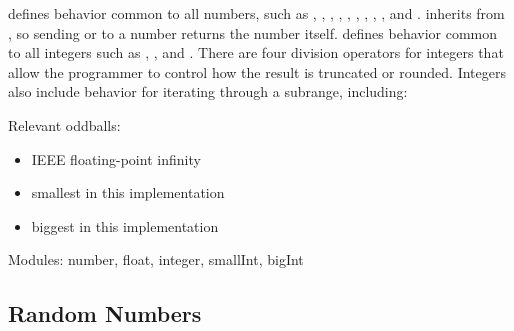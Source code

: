 \documentclass[letterpaper,10pt,english]{sphinxmanual}
\begin{document}
\begin{sphinxVerbatim}[commandchars=\\\{\}]
\end{sphinxVerbatim}

 defines behavior common to all numbers, such as , , ,
, , , , , , and . 
inherits from , so sending  or  to a number returns the
number itself.  defines behavior common to all integers such as , , and
. There are four division operators for integers that allow the programmer to control
how the result is truncated or rounded. Integers also include behavior for iterating through a subrange,
including:

\begin{sphinxVerbatim}[commandchars=\\\{\}]
\end{sphinxVerbatim}

Relevant oddballs:
\begin{itemize}
\item {} 
 IEEE floating-point infinity

\item {} 
 smallest  in this implementation

\item {} 
 biggest  in this implementation

\end{itemize}

Modules: number, float, integer, smallInt, bigInt


\subsection{Random Numbers}
\label{\detokenize{numbers:random-numbers}}
\begin{sphinxVerbatim}[commandchars=\\\{\}]
             
\end{sphinxVerbatim}
\end{document}
